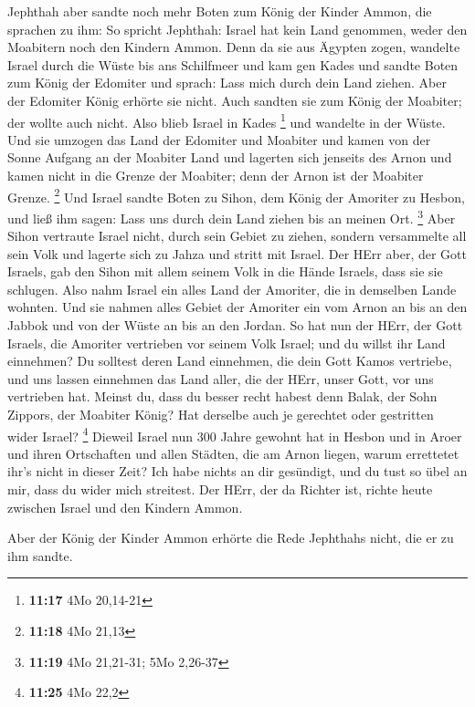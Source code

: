  Jephthah aber sandte noch mehr Boten zum König der
Kinder Ammon,  die sprachen zu ihm: So spricht Jephthah:
Israel hat kein Land genommen, weder den Moabitern noch den Kindern
Ammon.  Denn da sie aus Ägypten zogen, wandelte Israel
durch die Wüste bis ans Schilfmeer und kam gen Kades  und
sandte Boten zum König der Edomiter und sprach: Lass mich durch dein
Land ziehen. Aber der Edomiter König erhörte sie nicht. Auch sandten sie
zum König der Moabiter; der wollte auch nicht. Also blieb Israel in
Kades \footnote{\textbf{11:17} 4Mo 20,14-21}  und
wandelte in der Wüste. Und sie umzogen das Land der Edomiter und
Moabiter und kamen von der Sonne Aufgang an der Moabiter Land und
lagerten sich jenseits des Arnon und kamen nicht in die Grenze der
Moabiter; denn der Arnon ist der Moabiter Grenze. \footnote{\textbf{11:18}
  4Mo 21,13}  Und Israel sandte Boten zu Sihon, dem König
der Amoriter zu Hesbon, und ließ ihm sagen: Lass uns durch dein Land
ziehen bis an meinen Ort. \footnote{\textbf{11:19} 4Mo 21,21-31; 5Mo
  2,26-37}  Aber Sihon vertraute Israel nicht, durch sein
Gebiet zu ziehen, sondern versammelte all sein Volk und lagerte sich zu
Jahza und stritt mit Israel.  Der HErr aber, der Gott
Israels, gab den Sihon mit allem seinem Volk in die Hände Israels, dass
sie sie schlugen. Also nahm Israel ein alles Land der Amoriter, die in
demselben Lande wohnten.  Und sie nahmen alles Gebiet der
Amoriter ein vom Arnon an bis an den Jabbok und von der Wüste an bis an
den Jordan.  So hat nun der HErr, der Gott Israels, die
Amoriter vertrieben vor seinem Volk Israel; und du willst ihr Land
einnehmen?  Du solltest deren Land einnehmen, die dein
Gott Kamos vertriebe, und uns lassen einnehmen das Land aller, die der
HErr, unser Gott, vor uns vertrieben hat.  Meinst du,
dass du besser recht habest denn Balak, der Sohn Zippors, der Moabiter
König? Hat derselbe auch je gerechtet oder gestritten wider Israel?
\footnote{\textbf{11:25} 4Mo 22,2}  Dieweil Israel nun
300 Jahre gewohnt hat in Hesbon und in Aroer und ihren Ortschaften und
allen Städten, die am Arnon liegen, warum errettetet ihr's nicht in
dieser Zeit?  Ich habe nichts an dir gesündigt, und du
tust so übel an mir, dass du wider mich streitest. Der HErr, der da
Richter ist, richte heute zwischen Israel und den Kindern Ammon.

 Aber der König der Kinder Ammon erhörte die Rede
Jephthahs nicht, die er zu ihm sandte.

